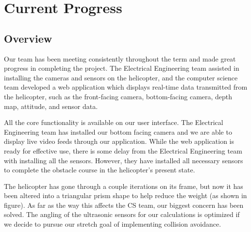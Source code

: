 \documentclass[onecolumn, oneside, letterpaper, draftclsnofoot, 10pt, compsoc]{IEEEtran}
\begin{document}

\section{Current Progress}
\subsection{Overview}
Our team has been meeting consistently throughout the term and made great progress in completing the project. The Electrical Engineering team assisted in installing the cameras and sensors on the helicopter, and the computer science team developed a web application which displays real-time data transmitted from the helicopter, such as the front-facing camera, bottom-facing camera, depth map, attitude, and sensor data.

\noindent
\newline
All the core functionality is available on our user interface. The Electrical Engineering team has installed our bottom facing camera and we are able to display live video feeds through our application. While the web application is ready for effective use, there is some delay from the Electrical Engineering team with installing all the sensors. However, they have installed all necessary sensors to complete the obstacle course in the helicopter's present state.

\noindent
\newline
The helicopter has gone through a couple iterations on its frame, but now it has been altered into a triangular prism shape to help reduce the weight (as shown in figure). As far as the way this affects the CS team, our biggest concern has been solved. The angling of the ultrasonic sensors for our calculations is optimized if we decide to pursue our stretch goal of implementing collision avoidance.
\end{document}
